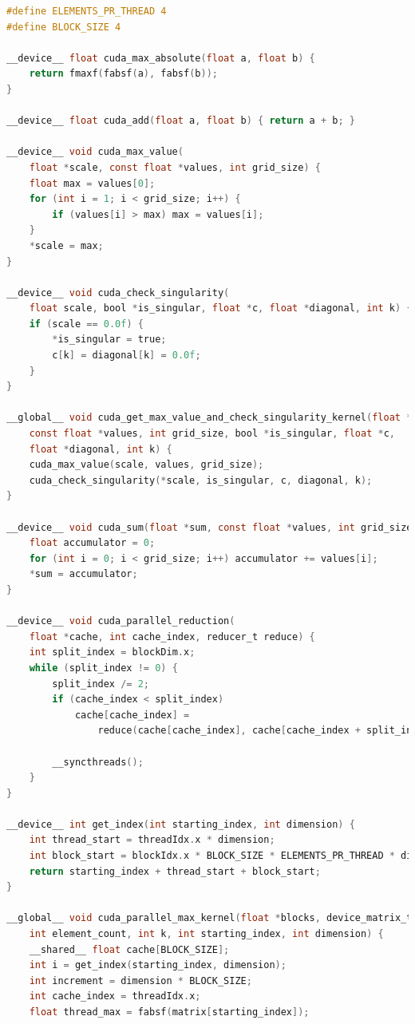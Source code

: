 \begin{lstlisting}[language=C, caption={QR Decomposition GPU Parallel Max Implementation}, label={lst:qr_gpu_parallel_max}]
#define ELEMENTS_PR_THREAD 4
#define BLOCK_SIZE 4

__device__ float cuda_max_absolute(float a, float b) {
    return fmaxf(fabsf(a), fabsf(b));
}

__device__ float cuda_add(float a, float b) { return a + b; }

__device__ void cuda_max_value(
    float *scale, const float *values, int grid_size) {
    float max = values[0];
    for (int i = 1; i < grid_size; i++) {
        if (values[i] > max) max = values[i];
    }
    *scale = max;
}

__device__ void cuda_check_singularity(
    float scale, bool *is_singular, float *c, float *diagonal, int k) {
    if (scale == 0.0f) {
        *is_singular = true;
        c[k] = diagonal[k] = 0.0f;
    }
}

__global__ void cuda_get_max_value_and_check_singularity_kernel(float *scale,
    const float *values, int grid_size, bool *is_singular, float *c,
    float *diagonal, int k) {
    cuda_max_value(scale, values, grid_size);
    cuda_check_singularity(*scale, is_singular, c, diagonal, k);
}

__device__ void cuda_sum(float *sum, const float *values, int grid_size) {
    float accumulator = 0;
    for (int i = 0; i < grid_size; i++) accumulator += values[i];
    *sum = accumulator;
}

__device__ void cuda_parallel_reduction(
    float *cache, int cache_index, reducer_t reduce) {
    int split_index = blockDim.x;
    while (split_index != 0) {
        split_index /= 2;
        if (cache_index < split_index)
            cache[cache_index] =
                reduce(cache[cache_index], cache[cache_index + split_index]);

        __syncthreads();
    }
}

__device__ int get_index(int starting_index, int dimension) {
    int thread_start = threadIdx.x * dimension;
    int block_start = blockIdx.x * BLOCK_SIZE * ELEMENTS_PR_THREAD * dimension;
    return starting_index + thread_start + block_start;
}

__global__ void cuda_parallel_max_kernel(float *blocks, device_matrix_t matrix,
    int element_count, int k, int starting_index, int dimension) {
    __shared__ float cache[BLOCK_SIZE];
    int i = get_index(starting_index, dimension);
    int increment = dimension * BLOCK_SIZE;
    int cache_index = threadIdx.x;
    float thread_max = fabsf(matrix[starting_index]);


\end{lstlisting}
